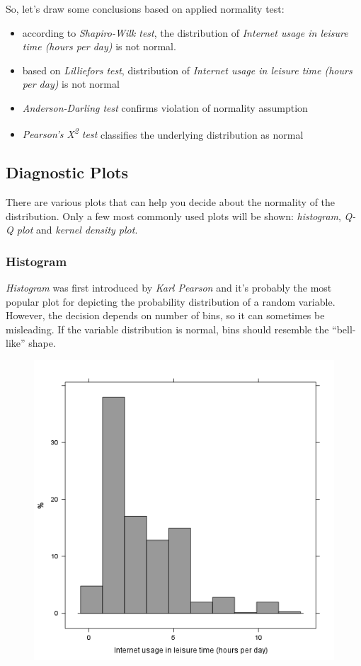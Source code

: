 \documentclass[]{article}
\makeatletter
\def\maxwidth{\ifdim\Gin@nat@width>\linewidth\linewidth
\else\Gin@nat@width\fi}
\let\Oldincludegraphics\includegraphics
\renewcommand{\includegraphics}[1]{\Oldincludegraphics[width=\maxwidth]{#1}}
\makeatother
\begin{document}
So, let's draw some conclusions based on applied normality test:

\begin{itemize}
\item
  according to \emph{Shapiro-Wilk test}, the distribution of
  \emph{Internet usage in leisure time (hours per day)} is not normal.
\item
  based on \emph{Lilliefors test}, distribution of \emph{Internet usage
  in leisure time (hours per day)} is not normal
\item
  \emph{Anderson-Darling test} confirms violation of normality
  assumption
\item
  \emph{Pearson's Χ\textsuperscript{2} test} classifies the underlying
  distribution as normal
\end{itemize}
\subsection{Diagnostic Plots}

There are various plots that can help you decide about the normality of
the distribution. Only a few most commonly used plots will be shown:
\emph{histogram}, \emph{Q-Q plot} and \emph{kernel density plot}.

\subsubsection{Histogram}

\emph{Histogram} was first introduced by \emph{Karl Pearson} and it's
probably the most popular plot for depicting the probability
distribution of a random variable. However, the decision depends on
number of bins, so it can sometimes be misleading. If the variable
distribution is normal, bins should resemble the ``bell-like'' shape.

\begin{figure}[htbp]
\centering
\includegraphics{12bea9ba14449f76d79a9d5792bf29f9.png}
\caption{}
\end{figure}
\end{document}
